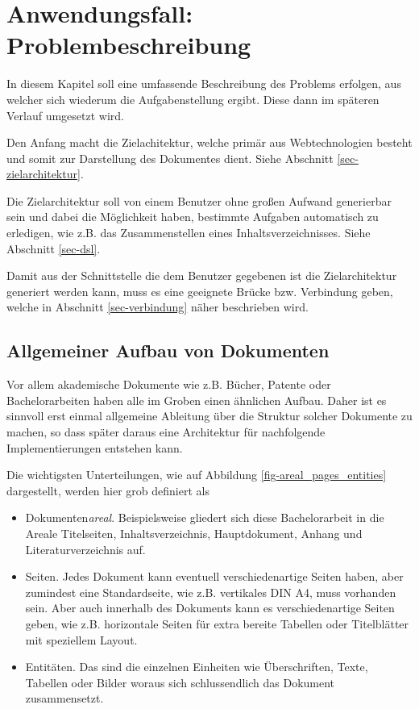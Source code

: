 \chapter{Anwendungsfall: Problembeschreibung}

In diesem Kapitel soll eine umfassende Beschreibung des Problems erfolgen,
aus welcher sich wiederum die Aufgabenstellung ergibt. Diese dann im
späteren Verlauf umgesetzt wird.

Den Anfang macht die Zielachitektur, welche primär aus Webtechnologien
besteht und somit zur Darstellung des Dokumentes dient. Siehe
Abschnitt \ref{sec-zielarchitektur}.

Die Zielarchitektur soll von einem Benutzer ohne großen Aufwand
generierbar sein und dabei die Möglichkeit haben, bestimmte
Aufgaben automatisch zu erledigen, wie z.B. das Zusammenstellen
eines Inhaltsverzeichnisses. Siehe Abschnitt \ref{sec-dsl}.

Damit aus der Schnittstelle die dem Benutzer gegebenen ist die Zielarchitektur
generiert werden kann, muss es eine geeignete Brücke bzw. Verbindung
geben, welche in Abschnitt \ref{sec-verbindung} näher beschrieben wird.

\section{Allgemeiner Aufbau von Dokumenten}

Vor allem akademische Dokumente wie z.B. Bücher, Patente oder Bachelorarbeiten
haben alle im Groben einen ähnlichen Aufbau. Daher ist es sinnvoll erst einmal
allgemeine Ableitung über die Struktur solcher Dokumente zu machen, so dass
später daraus eine Architektur für nachfolgende Implementierungen entstehen kann.

Die wichtigsten Unterteilungen,
  wie auf Abbildung \ref{fig-areal_pages_entities} dargestellt,
werden hier grob definiert als

\begin{itemize}
  \item Dokumenten\emph{areal}.
        Beispielsweise gliedert sich diese Bachelorarbeit in die
        Areale Titelseiten, Inhaltsverzeichnis, Hauptdokument, Anhang und
        Literaturverzeichnis auf.
  \item Seiten.
        Jedes Dokument kann eventuell verschiedenartige Seiten haben, aber zumindest
        eine Standardseite, wie z.B. vertikales DIN A4, muss vorhanden sein.
        Aber auch innerhalb des Dokuments kann es verschiedenartige Seiten
        geben, wie z.B. horizontale Seiten für extra bereite Tabellen oder
        Titelblätter mit speziellem Layout.
  \item Entitäten.
        Das sind die einzelnen Einheiten wie Überschriften, Texte, Tabellen
        oder Bilder woraus sich schlussendlich das Dokument zusammensetzt.
\end{itemize}

